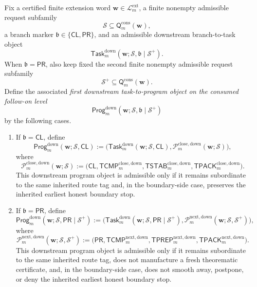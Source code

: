 \begin{definition}
\label{def:first-downstream-task-to-program-object-on-the-consumed-follow-on-level}
Fix a certified finite extension word \(\mathbf w\in\mathcal L^{\mathrm{ext}}_{m}\), a finite nonempty admissible request subfamily
\[
 \mathcal S \subseteq \mathsf{Q}^{\mathrm{cons}}_{m}(\mathbf w),
\]
a branch marker \(\mathfrak b\in\{\mathsf{CL},\mathsf{PR}\}\), and an admissible downstream branch-to-task object
\[
 \mathsf{Task}^{\mathrm{down}}_{m}(\mathbf w;\mathcal S,\mathfrak b\mid\mathcal S^{+}).
\]
When \(\mathfrak b=\mathsf{PR}\), also keep fixed the second finite nonempty admissible request subfamily
\[
 \mathcal S^{+}\subseteq \mathsf{Q}^{\mathrm{cons}}_{m}(\mathbf w).
\]
Define the associated \emph{first downstream task-to-program object on the consumed follow-on level}
\[
 \mathsf{Prog}^{\mathrm{down}}_{m}(\mathbf w;\mathcal S,\mathfrak b\mid\mathcal S^{+})
\]
by the following cases.
\begin{enumerate}[label=(\roman*)]
 \item If \(\mathfrak b=\mathsf{CL}\), define
\[
 \mathsf{Prog}^{\mathrm{down}}_{m}(\mathbf w;\mathcal S,\mathsf{CL})
 :=
 \bigl(\mathsf{Task}^{\mathrm{down}}_{m}(\mathbf w;\mathcal S,\mathsf{CL}),\mathcal P^{\mathrm{close,down}}_{m}(\mathbf w;\mathcal S)\bigr),
\]
where
\[
 \mathcal P^{\mathrm{close,down}}_{m}(\mathbf w;\mathcal S)
 :=
 \bigl(\mathsf{CL},\mathsf{TCMP}^{\mathrm{close,down}}_{m},\mathsf{TSTAB}^{\mathrm{close,down}}_{m},\mathsf{TPACK}^{\mathrm{close,down}}_{m}\bigr).
\]
This downstream program object is admissible only if it remains subordinate to the same inherited route tag and, in the boundary-side case, preserves the inherited earliest honest boundary stop.

 \item If \(\mathfrak b=\mathsf{PR}\), define
\[
 \mathsf{Prog}^{\mathrm{down}}_{m}(\mathbf w;\mathcal S,\mathsf{PR}\mid\mathcal S^{+})
 :=
 \bigl(\mathsf{Task}^{\mathrm{down}}_{m}(\mathbf w;\mathcal S,\mathsf{PR}\mid\mathcal S^{+}),\mathcal P^{\mathrm{next,down}}_{m}(\mathbf w;\mathcal S,\mathcal S^{+})\bigr),
\]
where
\[
 \mathcal P^{\mathrm{next,down}}_{m}(\mathbf w;\mathcal S,\mathcal S^{+})
 :=
 \bigl(\mathsf{PR},\mathsf{TCMP}^{\mathrm{next,down}}_{m},\mathsf{TPREP}^{\mathrm{next,down}}_{m},\mathsf{TPACK}^{\mathrm{next,down}}_{m}\bigr).
\]
This downstream program object is admissible only if it remains subordinate to the same inherited route tag, does not manufacture a fresh theorematic certificate, and, in the boundary-side case, does not smooth away, postpone, or deny the inherited earliest honest boundary stop.
\end{enumerate}
\end{definition}

